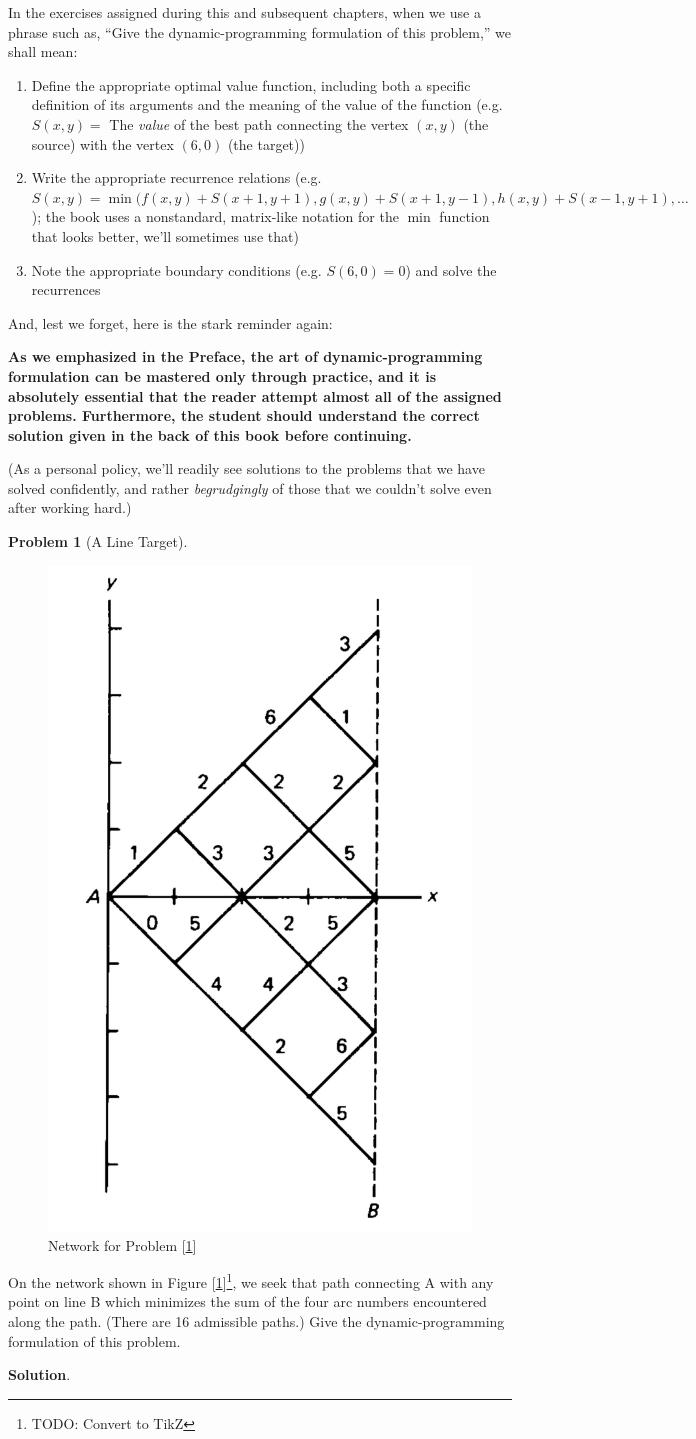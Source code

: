 \documentclass[english,notitlepage,smartquotes]{hgbreport}
\theoremstyle{definition}
\theoremstyle{definition}
\newtheorem{problem}{Problem}
\theoremstyle{remark}
\theoremstyle{definition}
\theoremstyle{plain}
\theoremstyle{definition}
\begin{document}
\hrulefill

In the exercises assigned during this and subsequent chapters, when we use a phrase such as, ``Give the dynamic-programming formulation of this problem,'' we shall mean: 
\begin{enumerate}
\item Define the appropriate optimal value function, including both a specific definition of its arguments and the meaning of the value of the function (e.g. $S(x,y)=$ The \textit{value} of the best path connecting the vertex $(x,y)$ (the source) with the vertex $(6,0)$ (the target))
\item Write the appropriate recurrence relations (e.g. $S(x,y)=\min(f(x,y) + S(x+1,y+1), g(x,y)+S(x+1,y-1), h(x,y)+S(x-1,y+1),\dots$); the book uses a nonstandard, matrix-like notation for the $\min$ function that looks better, we'll sometimes use that)
\item Note the appropriate boundary conditions (e.g. $S(6,0)=0$) and solve the recurrences
\end{enumerate}
\hrulefill


And, lest we forget, here is the stark reminder again:

\hrulefill

\textbf{As we emphasized in the Preface, the art of dynamic-programming formulation can be mastered only through practice, and it is absolutely essential that the reader attempt almost all of the assigned problems.  Furthermore, the student should understand the correct solution given in the back of this book before continuing.}

\hrulefill

(As a personal policy, we'll readily see solutions to the problems that we have solved confidently, and rather \emph{begrudgingly} of those that we couldn't solve even after working hard.)


\begin{problem}[A Line Target]
\begin{figure}[!h]
\centering
\includegraphics[width=.345\textwidth]{p11-pt-to-line}
\caption{Network for Problem [\ref{pr:1.1}]}
\label{fig:p1.1}
\end{figure}
On the network shown in Figure [\ref{fig:p1.1}]\footnote{TODO: Convert to TikZ}, we seek that path connecting A with any point on line B which minimizes the sum of the four arc numbers encountered along the path. (There are 16 admissible paths.) Give the dynamic-programming formulation of this problem.
\label{pr:1.1}
\end{problem}
\textbf{Solution}.
\end{document}
